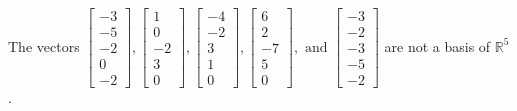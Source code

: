 \begin{exercise}
\begin{exerciseStatement}
  \end{exerciseStatement}
  \begin{exerciseAnswer}
   The vectors \(\left[\begin{array}{r}
-3 \\
-5 \\
-2 \\
0 \\
-2
\end{array}\right] , \left[\begin{array}{r}
1 \\
0 \\
-2 \\
3 \\
0
\end{array}\right] , \left[\begin{array}{r}
-4 \\
-2 \\
3 \\
1 \\
0
\end{array}\right] , \left[\begin{array}{r}
6 \\
2 \\
-7 \\
5 \\
0
\end{array}\right] , \text{ and } \left[\begin{array}{r}
-3 \\
-2 \\
-3 \\
-5 \\
-2
\end{array}\right]\) 
  	 are not  a basis of \(\mathbb{R}^5\).
  


  \end{exerciseAnswer}
\end{exercise}